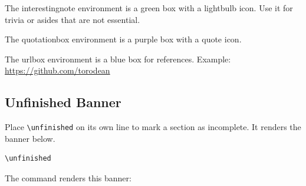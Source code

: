 \begin{interestingnote}
	The interestingnote environment is a green box with a lightbulb icon. Use it for trivia or asides that are not essential.
\end{interestingnote}

\begin{quotationbox}
	The quotationbox environment is a purple box with a quote icon.
\end{quotationbox}

\begin{urlbox}
	The urlbox environment is a blue box for references. Example: \url{https://github.com/torodean}
\end{urlbox}

\subsection{Unfinished Banner}

Place \lstinline|\unfinished| on its own line to mark a section as incomplete. It renders the banner below.

\begin{lstlisting}[style=latexstyle]
\unfinished
\end{lstlisting}

The command renders this banner:

\vspace{10pt}
\unfinished
